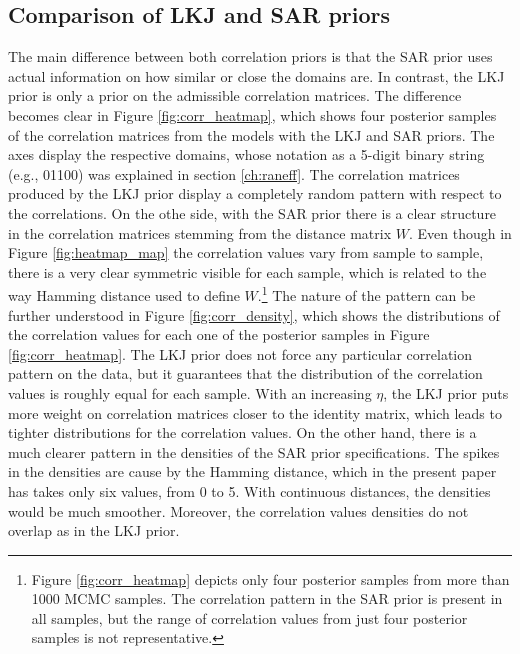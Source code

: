 \subsection{Comparison of LKJ and SAR priors}
\label{ch:comparison_lkj_sar}
The main difference between both correlation priors is that the SAR prior uses actual information on how similar or close the domains are.
In contrast, the LKJ prior is only a prior on the admissible correlation matrices.
The difference becomes clear in Figure \ref{fig:corr_heatmap}, which shows four posterior samples of the correlation matrices from the models with the LKJ and SAR priors.
The axes display the respective domains, whose notation as a 5-digit binary string (e.g., 01100) was explained in section \ref{ch:raneff}.
The correlation matrices produced by the LKJ prior display a completely random pattern with respect to the correlations.
On the othe side, with the SAR prior there is a clear structure in the correlation matrices stemming from the distance matrix $W$.
Even though in Figure \ref{fig:heatmap_map} the correlation values vary from sample to sample, there is a very clear symmetric visible for each sample, which is related to the way Hamming distance used to define $W$.\footnote{Figure \ref{fig:corr_heatmap} depicts only four posterior samples from more than 1000 MCMC samples. The correlation pattern in the SAR prior is present in all samples, but the range of correlation values from just four posterior samples is not representative.}
The nature of the pattern can be further understood in Figure \ref{fig:corr_density}, which shows the distributions of the correlation values for each one of the posterior samples in Figure \ref{fig:corr_heatmap}.
The LKJ prior does not force any particular correlation pattern on the data, but it guarantees that the distribution of the correlation values is roughly equal for each sample.
With an increasing $\eta$, the LKJ prior puts more weight on correlation matrices closer to the identity matrix, which leads to tighter distributions for the correlation values.
On the other hand, there is a much clearer pattern in the densities of the SAR prior specifications.
The spikes in the densities are cause by the Hamming distance, which in the present paper has takes only six values, from 0 to 5.
With continuous distances, the densities would be much smoother.
Moreover, the correlation values densities do not overlap as in the LKJ prior.


